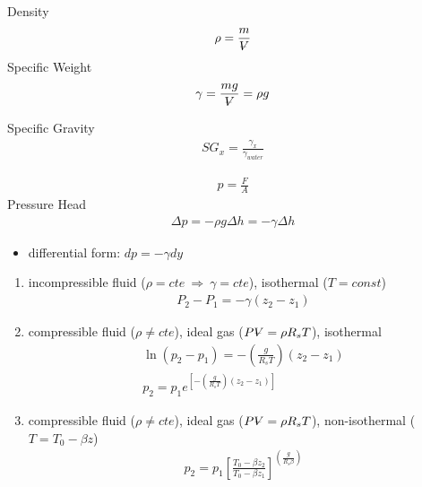 

Density
\begin{equation*}
    \rho = \frac{m}{\volume}
\end{equation*} 
Specific Weight
\begin{align*}
    \gamma = \frac{mg}{\volume} = \rho g
\end{align*}

Specific Gravity
\begin{align*}
    SG_x = \frac{\gamma_x}{\gamma_{water}}
\end{align*}

\begin{align*}
    p = \frac{F}{A}
\end{align*}
Pressure Head
\begin{align*}
    \Delta p = -\rho g \Delta h = -\gamma \Delta h
\end{align*}
\begin{itemize}
    \item differential form: $dp = -\gamma dy$
\end{itemize}
\begin{enumerate}
    \item incompressible fluid ($\rho=cte \ \Rightarrow \ \gamma=cte$), isothermal ($T=const$)
    \begin{align*}
        P_2 - P_1 = -\gamma(z_2-z_1)
    \end{align*}
    \item compressible fluid ($\rho \neq cte$), ideal gas ($P\volume = \rho R_s T$), isothermal
    \begin{align*}
        \ln (p_2-p_1) = -\left(\frac{g}{R_sT}\right)(z_2-z_1)\\
        p_2 = p_1 e^{\left[-\left(\frac{g}{R_sT}\right)(z_2-z_1)\right]}
    \end{align*}
    \item compressible fluid ($\rho \neq cte$), ideal gas ($P\volume = \rho R_s T$), non-isothermal ($T  = T_{0} - \beta z$)
    \begin{align*}
        p_2 = p_1\left[\frac{T_0 - \beta z_2}{T_0 - \beta z_1}\right]^{\left(\frac{g}{R_s \beta}\right)}
    \end{align*}
\end{enumerate}


